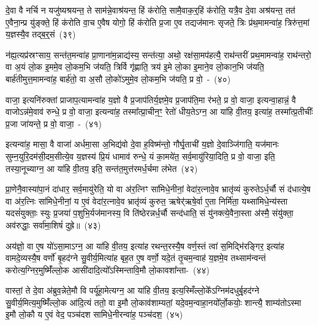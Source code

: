 {\anuvakamend[{प॒श्य॒ति॒ ताभ्या॒मह॑रैदसाव॒ फलꣳ॑ स॒प्त च॑}]}

दे॒वा वै नर्चि न यजु॑ष्यश्रयन्त॒ ते साम॑न्ने॒वाश्र॑यन्त॒ हिं क॑रोति॒ सामै॒वाक॒र्॒\mbox{}हिं क॑रोति॒ यत्रै॒व दे॒वा अश्र॑यन्त॒ तत॑ ए॒वैना॒न्प्र यु॑ङ्क्ते॒ हिं क॑रोति वा॒च ए॒वैष योगो॒ हिं क॑रोति प्र॒जा ए॒व तद्यज॑मानः सृजते॒ त्रिः प्र॑थ॒मामन्वा॑ह॒ त्रिरु॑त्त॒मां य॒ज्ञस्यै॒व तद्ब॒र्॒\mbox{}सं~(३९)\ip

न॑ह्य॒त्यप्र॑स्रꣳसाय॒ सन्त॑त॒मन्वा॑ह प्रा॒णाना॑म॒न्नाद्य॑स्य॒ सन्त॑त्या॒ अथो॒ रक्ष॑सा॒मप॑हत्यै॒ राथ॑न्तरीं प्रथ॒मामन्वा॑ह॒ राथ॑न्तरो॒ वा अ॒यं लो॒क इ॒ममे॒व लो॒कम॒भि ज॑यति॒ त्रिर्वि गृ॑ह्णाति॒ त्रय॑ इ॒मे लो॒का इ॒माने॒व लो॒कान॒भि ज॑यति॒ बार्\mbox{}ह॑तीमुत्त॒मामन्वा॑ह॒ बार्\mbox{}ह॑तो॒ वा अ॒सौ लो॒को॑\-ऽमुमे॒व लो॒कम॒भि ज॑यति॒ प्र वो॒~-~(४०)\ip

वाजा॒ इत्यनि॑रुक्तां प्राजाप॒त्यामन्वा॑ह य॒ज्ञो वै प्र॒जा\-प॑तिर्य॒ज्ञमे॒व प्र॒जा\-प॑ति॒मा र॑भते॒ प्र वो॒ वाजा॒ इत्यन्वा॒हान्नं॒ वै वाजो\-ऽन्न॑मे॒वाव॑ रुन्धे॒ प्र वो॒ वाजा॒ इत्यन्वा॑ह॒ तस्मा᳚त्प्रा॒चीन॒ꣳ॒ रेतो॑ धीय॒ते\-ऽग्न॒ आ या॑हि वी॒तय॒ इत्या॑ह॒ तस्मा᳚त्प्र॒तीचीः᳚ प्र॒जा जा॑यन्ते॒ प्र वो॒ वाजा॒~-~(४१)\ip

इत्यन्वा॑ह॒ मासा॒ वै वाजा॑ अर्धमा॒सा अ॒भिद्य॑वो दे॒वा ह॒विष्म॑न्तो॒ गौर्घृ॒ताची॑ य॒ज्ञो दे॒वाञ्जि॑गाति॒ यज॑मानः सुम्न॒युरि॒दम॑सी॒दम॒सीत्ये॒व य॒ज्ञस्य॑ प्रि॒यं धामाव॑ रुन्धे॒ यं का॒मये॑त॒ सर्व॒मायु॑रिया॒दिति॒ प्र वो॒ वाजा॒ इति॒ तस्या॒नूच्याग्न॒ आ या॑हि वी॒तय॒ इति॒ सन्त॑त॒मुत्त॑रमर्ध॒र्चमा ल॑भेत~(४२)\ip

प्रा॒णेनै॒वास्या॑पा॒नं दा॑धार॒ सर्व॒मायु॑रेति॒ यो वा अ॑र॒त्निꣳ सा॑मिधे॒नीनां॒ वेदा॑र॒त्नावे॒व भ्रातृ॑व्यं कुरुते\-ऽर्ध॒र्चौ सं द॑धात्ये॒ष वा अ॑र॒त्निः सा॑मिधे॒नीनां॒ य ए॒वं वेदा॑र॒त्नावे॒व भ्रातृ॑व्यं कुरुत॒ ऋषेर्॑\mbox{}ऋषे॒र्वा ए॒ता निर्मि॑ता॒ यथ्सा॑मिधे॒न्य॑स्ता यदसं॑युक्ताः॒ स्युः प्र॒जया॑ प॒शुभि॒र्यज॑मानस्य॒ वि ति॑ष्ठेरन्नर्ध॒र्चौ सन्द॑धाति॒ सं यु॑नक्त्ये॒वैना॒स्ता अ॑स्मै॒ संयु॑क्ता॒ अव॑रुद्धाः॒ सर्वा॑मा॒शिषं॑ दुह्रे॥~(४३)\ip


{\anuvakamend[{ब॒र्॒\mbox{}सं वो॑ जायन्ते॒ प्र वो॒ वाजा॑ लभेत दधाति॒ सन्दश॑ च}]}

अय॑ज्ञो॒ वा ए॒ष यो॑\-ऽसा॒मा\-ऽग्न॒ आ या॑हि वी॒तय॒ इत्या॑ह रथन्त॒रस्यै॒ष वर्ण॒स्तं त्वा॑ स॒मिद्भि॑रङ्गिर॒ इत्या॑ह वामदे॒व्यस्यै॒ष वर्णो॑ बृ॒हद॑ग्ने सु॒वीर्य॒मित्या॑ह बृह॒त ए॒ष वर्णो॒ यदे॒तं तृ॒चम॒न्वाह॑ य॒ज्ञमे॒व तथ्साम॑न्वन्तं करोत्य॒ग्निर॒मुष्मिँ॑ल्लो॒क आसी॑दादि॒त्यो᳚\-ऽस्मिन्तावि॒मौ लो॒कावशा᳚न्ता-~(४४)\ip

वास्तां॒ ते दे॒वा अ॑ब्रुव॒न्नेते॒मौ वि पर्यू॑हा॒मेत्यग्न॒ आ या॑हि वी॒तय॒ इत्य॒स्मिँल्लो॒के᳚\-ऽग्निम॑दधुर्बृ॒हद॑ग्ने सु॒वीर्य॒मित्य॒मुष्मिँ॑ल्लो॒क आ॑दि॒त्यं ततो॒ वा इ॒मौ लो॒काव॑शाम्यतां॒ यदे॒वम॒न्वाहा॒नयो᳚र्लो॒कयोः॒ शान्त्यै॒ शाम्य॑तो\-ऽस्मा इ॒मौ लो॒कौ य ए॒वं वेद॒ पञ्च॑दश सामिधे॒नीरन्वा॑ह॒ पञ्च॑दश॒~(४५)\ip

